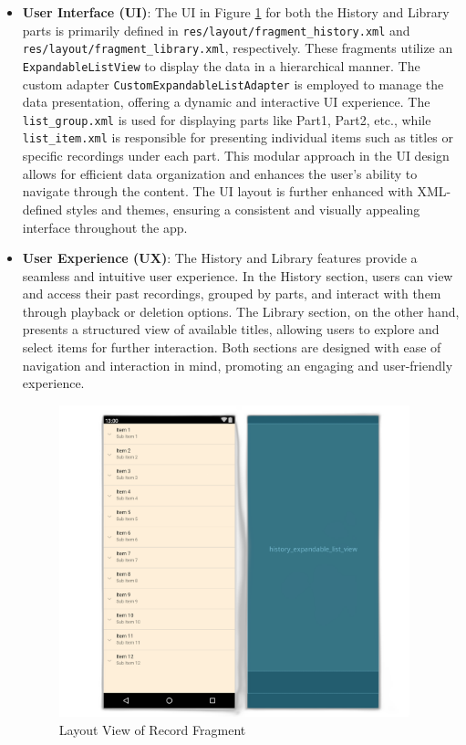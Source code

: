 \documentclass[conference,10pt,letterpaper]{IEEEtran}
\begin{document}
	\begin{itemize}
		
		\item \textbf{User Interface (UI)}: 
		The UI in Figure \ref{fig:history_layout} for both the History and Library parts is primarily defined in \texttt{res/layout/fragment\_history.xml} and \texttt{res/layout/fragment\_library.xml}, respectively. These fragments utilize an \texttt{ExpandableListView} to display the data in a hierarchical manner. The custom adapter \texttt{CustomExpandableListAdapter} is employed to manage the data presentation, offering a dynamic and interactive UI experience. The \texttt{list\_group.xml} is used for displaying parts like Part1, Part2, etc., while \texttt{list\_item.xml} is responsible for presenting individual items such as titles or specific recordings under each part. This modular approach in the UI design allows for efficient data organization and enhances the user's ability to navigate through the content. The UI layout is further enhanced with XML-defined styles and themes, ensuring a consistent and visually appealing interface throughout the app.
		
		\newpage
		\item \textbf{User Experience (UX)}: 
		The History and Library features provide a seamless and intuitive user experience. In the History section, users can view and access their past recordings, grouped by parts, and interact with them through playback or deletion options. The Library section, on the other hand, presents a structured view of available titles, allowing users to explore and select items for further interaction. Both sections are designed with ease of navigation and interaction in mind, promoting an engaging and user-friendly experience.
		
		\begin{figure}[htbp]
			\centerline{\includegraphics[width=4in]{src/history layout remove.png}}
			\caption{Layout View of Record Fragment}
			\label{fig:history_layout}
		\end{figure}
		

\end{itemize}
\end{document}
